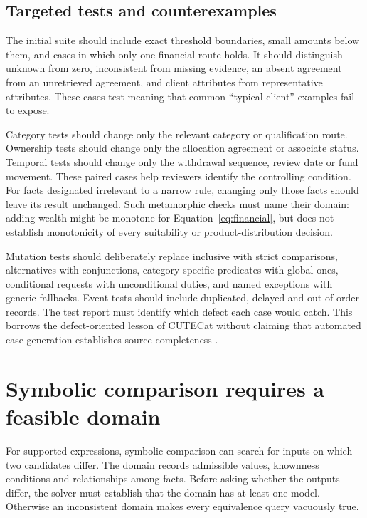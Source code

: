\subsection{Targeted tests and counterexamples}
\label{merge:P-04-prototype:05}


The initial suite should include exact threshold boundaries, small amounts below
them, and cases in which only one financial route holds. It should distinguish
unknown from zero, inconsistent from missing evidence, an absent agreement from
an unretrieved agreement, and client attributes from representative attributes.
These cases test meaning that common ``typical client'' examples fail to expose.

Category tests should change only the relevant category or qualification route.
Ownership tests should change only the allocation agreement or associate status.
Temporal tests should change only the withdrawal sequence, review date or fund
movement. These paired cases help reviewers identify the controlling condition.
For facts designated irrelevant to a narrow rule, changing only those facts should
leave its result unchanged. Such metamorphic checks must name their domain:
adding wealth might be monotone for Equation~\eqref{eq:financial}, but does not
establish monotonicity of every suitability or product-distribution decision.


Mutation tests should deliberately replace inclusive with strict comparisons,
alternatives with conjunctions, category-specific predicates with global ones,
conditional requests with unconditional duties, and named exceptions with generic
fallbacks. Event tests should include duplicated, delayed and out-of-order records.
The test report must identify which defect each case would catch. This borrows
the defect-oriented lesson of CUTECat without claiming that automated case
generation establishes source completeness \citep{cutecat2025}.

\section{Symbolic comparison requires a feasible domain}
\label{merge:M07:07}


For supported expressions, symbolic comparison can search for inputs on which two
candidates differ. The domain records admissible values, knownness conditions and
relationships among facts. Before asking whether the outputs differ, the solver
must establish that the domain has at least one model. Otherwise an inconsistent
domain makes every equivalence query vacuously true.

